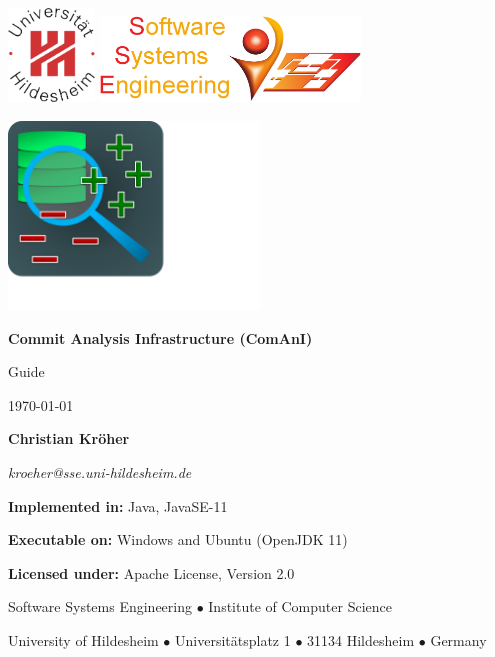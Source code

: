 \begin{titlepage}
\centering

{\includegraphics[height=2.5cm]{inserts/suh_logo.jpg} \hfill \includegraphics[height=2.3cm]{inserts/sse_logo.png}}\par\vspace{3cm}
\includegraphics[height=5cm,trim={0cm 3,4cm 9,7cm 0cm},clip]{inserts/comani_logo.pdf}\par\vspace{1cm}
{\Huge \textbf{Commit Analysis Infrastructure \newline (ComAnI)}}\par\vspace{1.5cm}
{\Huge Guide}\par\vspace{5mm}
{\Large \today}\par\vspace{1.5cm}
{\Large \textbf{Christian Kröher}}\par
{\Large \textit{kroeher@sse.uni-hildesheim.de}}\par\vspace{1.5cm}
{\textbf{Implemented in:} Java, JavaSE-11}\par
{\textbf{Executable on:} Windows and Ubuntu (OpenJDK 11)}\par
{\textbf{Licensed under:} Apache License, Version 2.0}\par
\vfill
{Software Systems Engineering $\bullet$ Institute of Computer Science}\par
{University of Hildesheim $\bullet$ Universit\"atsplatz 1 $\bullet$ 31134 Hildesheim $\bullet$ Germany}\par
\end{titlepage}